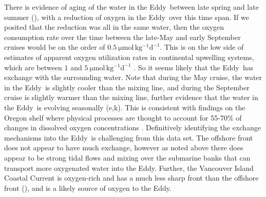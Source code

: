 \documentclass[draft]{agujournal2019}
\newcommand*{\Eddy}{{\sc Eddy}}
\begin{document}
There is evidence of aging of the water in the \Eddy\ between late spring and late summer (), with a reduction of oxygen in the \Eddy\ over this time span.  If we posited that the reduction was all in the same water, then the oxygen consumption rate over the time between the late-May and early September cruises would be on the order of $0.5\ \mathrm{\mu mol\, kg^{-1} d^{-1}}$.  This is on the low side of estimates of apparent oxygen utilization rates in continental upwelling systems, which are between $1$ and $5\  \mathrm{\mu mol\, kg^{-1} d^{-1}}$ \cite{dortchetal94,connollyetal10}.   So it seems likely that the \Eddy\ has exchange with the surrounding water.  Note that during the May cruise, the water in the \Eddy\ is slightly cooler than the mixing line, and during the September cruise is slightly warmer than the mixing line, further evidence that the water in the \Eddy\ is evolving seasonally (e,k).  This is consistent with findings on the Oregon shelf where physical processes are thought to account for 55-70\% of changes in dissolved oxygen concentrations \cite{adamsetal13}.  Definitively identifying the exchange mechanisms into the \Eddy\ is challenging from this data set.  The offshore front does not appear to have much exchange, however as noted above there does appear to be strong tidal flows and mixing over the submarine banks that can transport more oxygenated water into the \Eddy.  Further, the Vancouver Island Coastal Current is oxygen-rich and has a much less sharp front than the offshore front (), and is a likely source of oxygen to the \Eddy.
\end{document}
